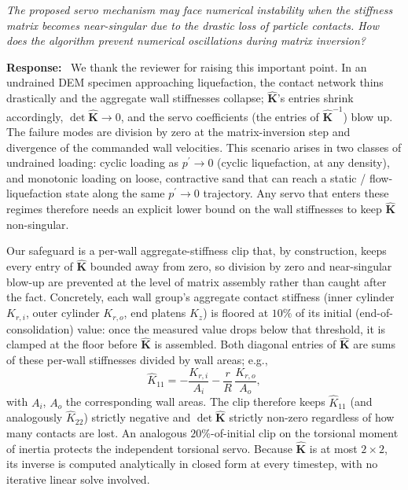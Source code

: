 \documentclass[11pt,a4paper]{article}
\newenvironment{rcomment}
  {\begin{leftbar}\color{black!75}\itshape}
  {\end{leftbar}\vspace{0.3em}}
\newcommand{\response}{\par\noindent\textbf{Response:}\ \ignorespaces}
\begin{document}
\begin{rcomment}
The proposed servo mechanism may face numerical instability when the
stiffness matrix becomes near-singular due to the drastic loss of particle
contacts. How does the algorithm prevent numerical oscillations during
matrix inversion?
\end{rcomment}

\response
We thank the reviewer for raising this important point. In an
undrained DEM
specimen approaching liquefaction, the contact network thins
drastically and the aggregate wall stiffnesses collapse;
$\hat{\mathbf{K}}$'s entries shrink accordingly,
$\det\hat{\mathbf{K}}\!\to\!0$, and the servo coefficients
(the entries of $\hat{\mathbf{K}}^{-1}$) blow up. The failure
modes are division by zero at the matrix-inversion step and
divergence of the commanded wall velocities. This scenario arises
in two classes of undrained loading: cyclic loading as
$p^{\prime}\!\to\!0$ (cyclic liquefaction, at any density), and
monotonic loading on loose, contractive sand that can reach a
static / flow-liquefaction state along the same
$p^{\prime}\!\to\!0$ trajectory. Any servo that enters these
regimes therefore needs an explicit lower bound on the wall
stiffnesses to keep $\hat{\mathbf{K}}$ non-singular.

Our safeguard is a per-wall aggregate-stiffness clip that, by
construction, keeps every entry of $\hat{\mathbf{K}}$ bounded away
from zero, so division by zero and near-singular blow-up are
prevented at the level of matrix assembly rather than caught after
the fact. Concretely, each wall group's aggregate contact stiffness
(inner cylinder $K_{r,i}$, outer cylinder $K_{r,o}$, end platens
$K_z$) is floored at $10\%$ of its initial (end-of-consolidation)
value: once the measured value drops below that threshold, it is
clamped at the floor before $\hat{\mathbf{K}}$ is assembled. Both
diagonal entries of $\hat{\mathbf{K}}$ are sums of these per-wall
stiffnesses divided by wall areas; e.g.,
\begin{equation}
\hat{K}_{11} = -\frac{K_{r,i}}{A_i} - \frac{r}{R}\,\frac{K_{r,o}}{A_o},
\label{eq:rl_Khat11}
\end{equation}
with $A_i$, $A_o$ the corresponding wall areas. The clip therefore
keeps $\hat{K}_{11}$ (and analogously $\hat{K}_{22}$) strictly
negative and $\det\hat{\mathbf{K}}$ strictly non-zero regardless of
how many contacts are lost. An analogous $20\%$-of-initial clip on
the torsional moment of inertia protects the independent torsional
servo. Because $\hat{\mathbf{K}}$ is at most $2\times 2$, its
inverse is computed analytically in closed form at every timestep,
with no iterative linear solve involved.
\end{document}

